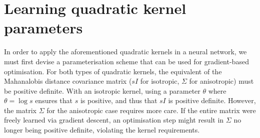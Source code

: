 \documentclass[a4paper, 12pt]{report}
\begin{document}
\section{Learning quadratic kernel parameters}
\label{sec:learning-pdm}
In order to apply the aforementioned quadratic kernels in a neural network, we must first devise a parameterisation scheme that can be used for gradient-based optimisation. For both types of quadratic kernels, the equivalent of the Mahanalobis distance covariance matrix ($sI$ for isotropic, $\Sigma$ for anisotropic) must be positive definite. With an isotropic kernel, using a parameter $\theta$ where $\theta = \log s$ ensures that $s$ is positive, and thus that $sI$ is positive definite. However, the matrix $\Sigma$ for the anisotropic case requires more care. If the entire matrix were freely learned via gradient descent, an optimisation step might result in $\Sigma$ no longer being positive definite, violating the kernel requirements.
\end{document}
